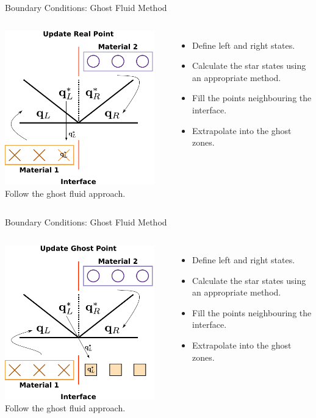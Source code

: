 \documentclass{beamer}
\begin{document}
\begin{frame}{Boundary Conditions: Ghost Fluid Method}
\begin{columns}
\column{6.5cm}
\centering
\includegraphics[width=6.5cm]{../images/multimodel_roe_real}
\column{4.5cm}
Follow the ghost fluid approach.
\begin{itemize}
\item{Define left and right states.}
\item{Calculate the star states using an appropriate method.}
\item{Fill the points neighbouring the interface.}
\item{Extrapolate into the ghost zones.}
\end{itemize}
\end{columns}
\end{frame}
\begin{frame}{Boundary Conditions: Ghost Fluid Method}
\begin{columns}
\column{6.5cm}
\centering
\includegraphics[width=6.5cm]{../images/multimodel_roe_ghost}
\column{4.5cm}
Follow the ghost fluid approach.
\begin{itemize}
\item{Define left and right states.}
\item{Calculate the star states using an appropriate method.}
\item{Fill the points neighbouring the interface.}
\item{Extrapolate into the ghost zones.}
\end{itemize}
\end{columns}
\end{frame}
\end{document}
